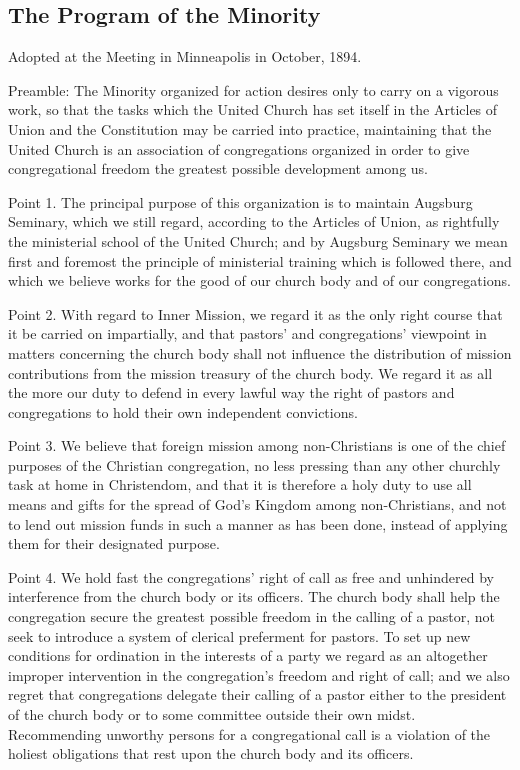 

\subsection{The Program of the Minority}

Adopted at the Meeting in Minneapolis in October, 1894.

Preamble: The Minority organized for action desires only to carry on a vigorous work, so that the tasks which the United Church has set itself in the Articles of Union and the Constitution may be carried into practice, maintaining that the United Church is an association of congregations organized in order to give congregational freedom the greatest possible development among us.

Point 1. The principal purpose of this organization is to maintain Augsburg Seminary, which we still regard, according to the Articles of Union, as rightfully the ministerial school of the United Church; and by Augsburg Seminary we mean first and foremost the principle of ministerial training which is followed there, and which we believe works for the good of our church body and of our congregations.

Point 2. With regard to Inner Mission, we regard it as the only right course that it be carried on impartially, and that pastors’ and congregations’ viewpoint in matters concerning the church body shall not influence the distribution of mission contributions from the mission treasury of the church body. We regard it as all the more our duty to defend in every lawful way the right of pastors and congregations to hold their own independent convictions.

Point 3. We believe that foreign mission among non-Christians is one of the chief purposes of the Christian congregation, no less pressing than any other churchly task at home in Christendom, and that it is therefore a holy duty to use all means and gifts for the spread of God’s Kingdom among non-Christians, and not to lend out mission funds in such a manner as has been done, instead of applying them for their designated purpose.

Point 4. We hold fast the congregations’ right of call as free and unhindered by interference from the church body or its officers. The church body shall help the congregation secure the greatest possible freedom in the calling of a pastor, not seek to introduce a system of clerical preferment for pastors. To set up new conditions for ordination in the interests of a party we regard as an altogether improper intervention in the congregation’s freedom and right of call; and we also regret that congregations delegate their calling of a pastor either to the president of the church body or to some committee outside their own midst. Recommending unworthy persons for a congregational call is a violation of the holiest obligations that rest upon the church body and its officers.

